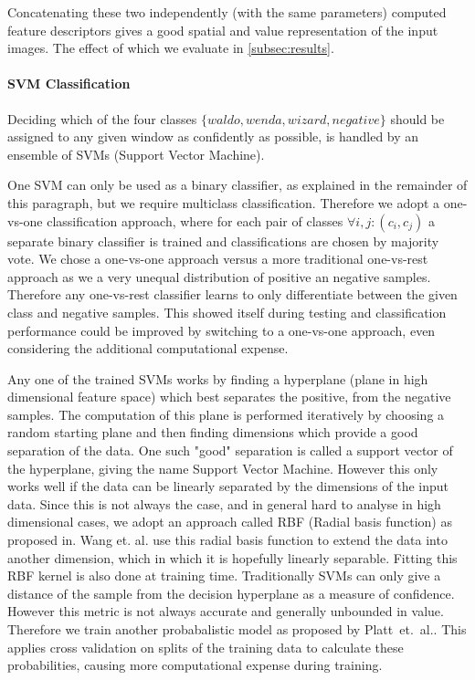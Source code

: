 \documentclass[11pt]{article}
\begin{document}
Concatenating these two independently (with the same parameters) computed feature descriptors gives a good spatial and
value representation of the input images. The effect of which we evaluate in \autoref{subsec:results}.


\paragraph{SVM Classification}
Deciding which of the four classes \( \{waldo, wenda, wizard, negative \} \) should be assigned to any given window 
as confidently as possible, is handled by an ensemble of SVMs (Support Vector Machine)\cite{Hearst:1998:SVM:630302.630387}.

One SVM can only be used as a binary classifier, as explained in the remainder of this paragraph, but we require multiclass classification. 
Therefore we adopt a one-vs-one classification approach, where for each pair of classes \( \forall i,j: (c_i,c_j) \) a separate binary classifier is trained
and classifications are chosen by majority vote. We chose a one-vs-one approach versus a more traditional one-vs-rest approach as we a very unequal distribution of
positive an negative samples. Therefore any one-vs-rest classifier learns to only differentiate between the given class and negative samples. This showed itself 
during testing and classification performance could be improved by switching to a one-vs-one approach, even considering the additional computational expense.

Any one of the trained SVMs works by finding a hyperplane (plane in high dimensional feature space) which best separates the positive, from the negative samples.
The computation of this plane is performed iteratively by choosing a random starting plane and then finding dimensions which provide a good separation of the data. 
One such "good" separation is called a support vector of the hyperplane, giving the name Support Vector Machine. 
However this only works well if the data can be linearly separated by the dimensions of the input data. 
Since this is not always the case, and in general hard to analyse in high dimensional cases, we adopt an approach called RBF (Radial basis function) as proposed in\cite{10.1007/978-3-540-28647-9_85}.
Wang et. al. use this radial basis function to extend the data into another dimension, which in which it is hopefully linearly separable. Fitting this RBF kernel is also done at training time.
Traditionally SVMs can only give a distance of the sample from the decision hyperplane as a measure of confidence. 
However this metric is not always accurate and generally unbounded in value. Therefore we train another probabalistic model as proposed by Platt\ et.\ al.\cite{Platt99probabilisticoutputs}.
This applies cross validation on splits of the training data to calculate these probabilities, causing more computational expense during training.
\end{document}
